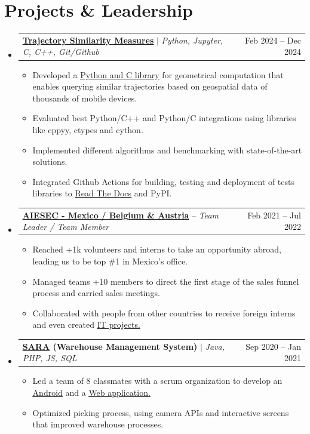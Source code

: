 \documentclass[letterpaper,11pt]{article}
\makeatletter
\newcommand{\resumeItem}[1]{
  \item\small{
    {#1 \vspace{-2pt}}
  }
}
\newcommand{\resumeProjectHeading}[2]{
    \item
    \begin{tabular*}{0.97\textwidth}{l@{\extracolsep{\fill}}r}
      \small#1 & #2 \\
    \end{tabular*}\vspace{-7pt}
}
\newcommand{\resumeSubHeadingListStart}{\begin{itemize}[leftmargin=0.15in, label={}]}
\newcommand{\resumeSubHeadingListEnd}{\end{itemize}}
\newcommand{\resumeItemListStart}{\begin{itemize}}
\newcommand{\resumeItemListEnd}{\end{itemize}\vspace{-5pt}}
\makeatother
\begin{document}
\section{Projects \& Leadership}
    \resumeSubHeadingListStart
      \resumeProjectHeading
          {\href{https://pypi.org/project/stmeasures/}
          {\textbf{\underline{Trajectory Similarity Measures}}} $|$
          \emph{Python, Jupyter, C, C++, Git/Github}}
          {Feb 2024 -- Dec 2024}
          \resumeItemListStart
            \resumeItem{Developed a \href{https://github.com/TT2024-B106/stmeasures}{\underline{Python and C library}} for geometrical
            computation that enables querying similar trajectories based on geospatial data of thousands of mobile devices.}
            \resumeItem{Evaluated best Python/C++ and Python/C integrations using libraries like cppyy, ctypes and cython.}
            \resumeItem{Implemented different algorithms and benchmarking with state-of-the-art solutions.}
            \resumeItem{Integrated Github Actions for building, testing and deployment of tests libraries to
            \href{https://stmeasures.readthedocs.io/en/latest/}{\underline{Read The Docs}} and PyPI.}
          \resumeItemListEnd
      \resumeProjectHeading
          {\href{https://drive.google.com/file/d/1EMWTYJzj80dJdlMeuz7X3F-bEpyTPFCr/view}
          {\textbf{\underline{AIESEC - Mexico}}
          \textbf{/ Belgium \& Austria}} --
          \emph{Team Leader / Team Member}}{Feb 2021 -- Jul 2022}
          \resumeItemListStart
            \resumeItem{Reached +1k volunteers and interns to take an opportunity abroad, leading us to be top \#1 in Mexico’s office.}
            \resumeItem{Managed teams +10 members to direct the first stage of the sales funnel process and carried sales meetings.}
            \resumeItem{Collaborated with people from other countries to receive foreign interns and even created
            \href{https://github.com/edoomm/time-tracker}{\underline{IT projects}.}}
          \resumeItemListEnd
      \resumeProjectHeading
          {\textbf{\href{https://drive.google.com/file/d/1b1CNu-eeZlTg1rc_nXvGEXps3hik2itj/view}
          {\underline{SARA}}
          (Warehouse Management System)} $|$
          \emph{Java, PHP, JS, SQL}}
          {Sep 2020 -- Jan 2021}
          \resumeItemListStart
            \resumeItem{Led a team of 8 classmates with a scrum organization to develop an
            \href{https://github.com/edoomm/sistema-picking-app}{\underline{Android}} and a 
            \href{https://github.com/edoomm/sistema-picking-web}{\underline{Web application}.}}
            \resumeItem{Optimized picking process, using camera APIs and interactive screens that improved warehouse processes.}
          \resumeItemListEnd
    \resumeSubHeadingListEnd
\end{document}
